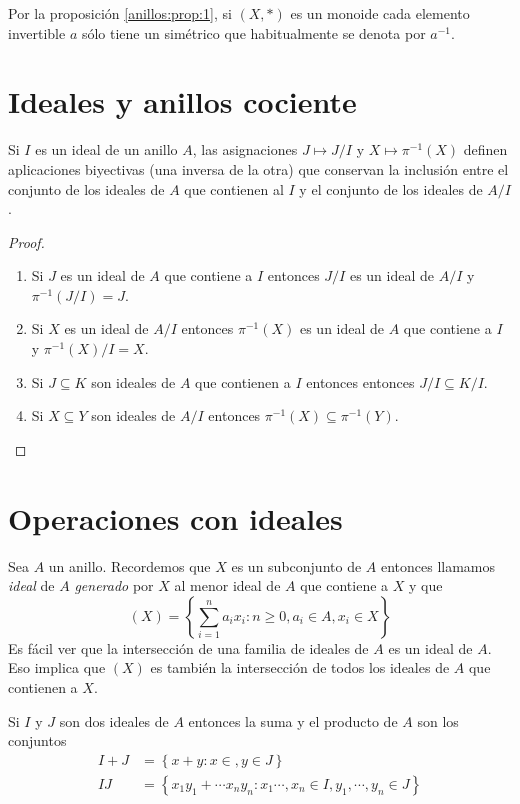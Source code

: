 Por la proposición \ref{anillos:prop:1}, si $(X,*)$ es un monoide cada elemento invertible $a$ sólo tiene un simétrico que habitualmente se denota por $a^{-1}$.



\section{Ideales y anillos cociente}

\begin{teo}\label{anillos:teo:1} Si $I$ es un ideal de un anillo $A$, las asignaciones $J\mapsto J/I$ y $X\mapsto\pi^{-1}(X)$ definen aplicaciones biyectivas (una inversa de la otra) que conservan la inclusión entre el conjunto de los ideales de $A$ que contienen al $I$ y el conjunto de los ideales de $A/I$.
\end{teo}

\begin{proof} \
    \begin{enumerate}[label=(\arabic*)]
        \item Si $J$ es un ideal de $A$ que contiene a $I$ entonces $J/I$ es un ideal de $A/I$ y $\pi^{-1}(J/I)=J$.
        \item Si $X$ es un ideal de $A/I$ entonces $\pi^{-1}(X)$ es un ideal de $A$ que contiene a $I$ y $\pi^{-1}(X)/I=X$.
        \item Si $J\subseteq K$ son ideales de $A$ que contienen a $I$ entonces entonces $J/I\subseteq K/I$.
        \item Si $X\subseteq Y$ son ideales de $A/I$ entonces $\pi^{-1}(X)\subseteq\pi^{-1}(Y)$.
    \end{enumerate}
\end{proof}

\section{Operaciones con ideales}

Sea $A$ un anillo. Recordemos que $X$ es un subconjunto de $A$ entonces llamamos {\it ideal} de $A$ {\it generado} por $X$ al menor ideal de $A$ que contiene a $X$ y que 
$$(X) =\left\lbrace \sum_{i=1}^na_ix_i : n\geq 0, a_i\in A, x_i\in X \right\rbrace$$
Es fácil ver que la intersección de una familia de ideales de $A$ es un ideal de $A$. Eso implica que $(X)$ es también la intersección de todos los ideales de $A$ que contienen a $X$.

Si $I$ y $J$ son dos ideales de $A$ entonces la suma y el producto de $A$ son los conjuntos
\begin{equation*}
    \begin{split}
        I + J &= \left\lbrace x+y : x\in, y\in J \right\rbrace \\
        IJ    &= \left\lbrace x_1y_1 + \cdots x_ny_n : x_1\cdots,x_n\in I, y_1,\cdots,y_n\in J \right\rbrace
    \end{split}
\end{equation*}


